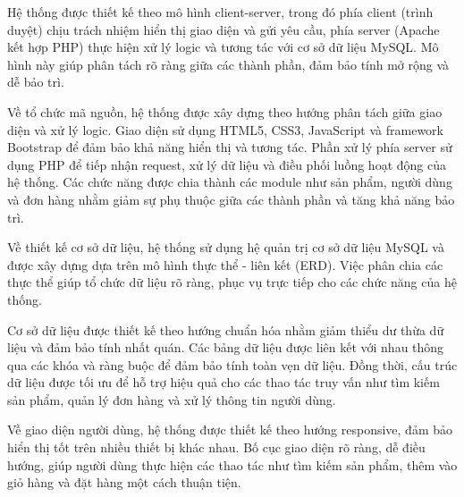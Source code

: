 \documentclass[pt = 12,a4paper]{article}
\begin{document}
\hspace{0.4cm} Hệ thống được thiết kế theo mô hình client-server, trong đó phía client (trình duyệt) chịu trách nhiệm hiển thị giao diện và gửi yêu cầu, phía server (Apache kết hợp PHP) thực hiện xử lý logic và tương tác với cơ sở dữ liệu MySQL. Mô hình này giúp phân tách rõ ràng giữa các thành phần, đảm bảo tính mở rộng và dễ bảo trì.

\hspace{0.4cm} Về tổ chức mã nguồn, hệ thống được xây dựng theo hướng phân tách giữa giao diện và xử lý logic. Giao diện sử dụng HTML5, CSS3, JavaScript và framework Bootstrap để đảm bảo khả năng hiển thị và tương tác. Phần xử lý phía server sử dụng PHP để tiếp nhận request, xử lý dữ liệu và điều phối luồng hoạt động của hệ thống. Các chức năng được chia thành các module như sản phẩm, người dùng và đơn hàng nhằm giảm sự phụ thuộc giữa các thành phần và tăng khả năng bảo trì.

\hspace{0.4cm} Về thiết kế cơ sở dữ liệu, hệ thống sử dụng hệ quản trị cơ sở dữ liệu MySQL và được xây dựng dựa trên mô hình thực thể - liên kết (ERD). Việc phân chia các thực thể giúp tổ chức dữ liệu rõ ràng, phục vụ trực tiếp cho các chức năng của hệ thống.


\hspace{0.4cm} Cơ sở dữ liệu được thiết kế theo hướng chuẩn hóa nhằm giảm thiểu dư thừa dữ liệu và đảm bảo tính nhất quán. Các bảng dữ liệu được liên kết với nhau thông qua các khóa và ràng buộc để đảm bảo tính toàn vẹn dữ liệu. Đồng thời, cấu trúc dữ liệu được tối ưu để hỗ trợ hiệu quả cho các thao tác truy vấn như tìm kiếm sản phẩm, quản lý đơn hàng và xử lý thông tin người dùng.

\hspace{0.4cm} Về giao diện người dùng, hệ thống được thiết kế theo hướng responsive, đảm bảo hiển thị tốt trên nhiều thiết bị khác nhau. Bố cục giao diện rõ ràng, dễ điều hướng, giúp người dùng thực hiện các thao tác như tìm kiếm sản phẩm, thêm vào giỏ hàng và đặt hàng một cách thuận tiện.
\end{document}

